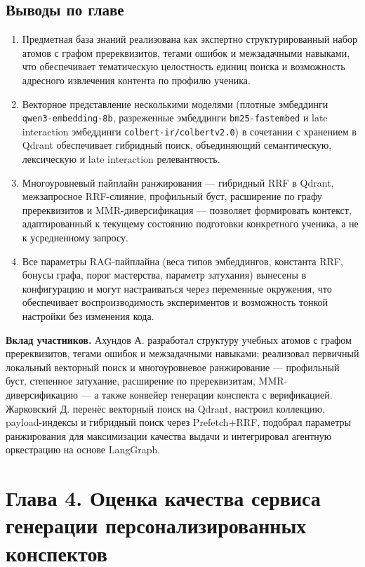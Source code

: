 \documentclass[a4paper,12pt]{extarticle}
\begin{document}
\subsection{Выводы по главе}

\begin{enumerate}
    \item Предметная база знаний реализована как экспертно структурированный набор
	атомов с графом пререквизитов, тегами ошибок и межзадачными навыками, что
	обеспечивает тематическую целостность единиц поиска и возможность
	адресного извлечения контента по профилю ученика.
    \item Векторное представление несколькими моделями (плотные эмбеддинги
	\texttt{qwen3-embedding-8b}, разреженные эмбеддинги \texttt{bm25-fastembed}
	 и late interaction эмбеддинги \texttt{colbert-ir/colbertv2.0}) в сочетании
	с хранением в Qdrant обеспечивает гибридный поиск, объединяющий
	семантическую, лексическую и late interaction релевантность.
    \item Многоуровневый пайплайн ранжирования --- гибридный RRF в Qdrant,
	межзапросное RRF-слияние, профильный буст,
	расширение по графу пререквизитов и MMR-диверсификация --- позволяет
	формировать контекст, адаптированный к текущему состоянию подготовки
	конкретного ученика, а не к усредненному запросу.
    \item Все параметры RAG-пайплайна (веса типов эмбеддингов, константа RRF, бонусы графа,
	порог мастерства, параметр затухания) вынесены в конфигурацию и могут
	настраиваться через переменные окружения, что обеспечивает воспроизводимость
	экспериментов и возможность тонкой настройки без изменения кода.
\end{enumerate}
\textbf{Вклад участников.}
Ахундов А. разработал структуру учебных атомов с графом пререквизитов, тегами ошибок
и межзадачными навыками; реализовал первичный локальный векторный поиск и многоуровневое
ранжирование --- профильный буст, степенное затухание, расширение по пререквизитам,
MMR-диверсификацию --- а также конвейер генерации конспекта с верификацией.
Жарковский Д. перенёс векторный поиск на Qdrant, настроил коллекцию, payload-индексы
и гибридный поиск через Prefetch+RRF, подобрал параметры ранжирования для максимизации
качества выдачи и интегрировал агентную оркестрацию на основе LangGraph.
\pagebreak

\section{
    Глава 4. Оценка качества сервиса генерации персонализированных конспектов
}
\label{ch:evaluation}
\end{document}
